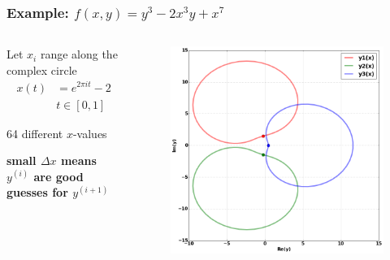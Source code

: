 \documentclass{beamer}
\begin{document}
\begin{frame}
  \frametitle{Example: $f(x,y) = y^3 - 2x^3y + x^7$}
  \begin{columns}
    \begin{column}{0.3\textwidth}
      Let $x_i$ range along the complex circle
      \begin{align*}
          x(t) &= e^{2 \pi i t} - 2 \\
          & t \in [0,1]
      \end{align*}

      {
        \small {\color{green!60!black} 64 different $x$-values}

        \vspace{16pt}

        {\bf small $\Delta x$ means $y^{(i)}$ are good guesses for $y^{(i+1)}$}

      }

    \end{column}

    \begin{column}{0.7\textwidth}
      \begin{figure}
        \centering
        \includegraphics[width=\textwidth]{images/ancontcomplicated64.png}
      \end{figure}
    \end{column}
  \end{columns}
\end{frame}
\end{document}
